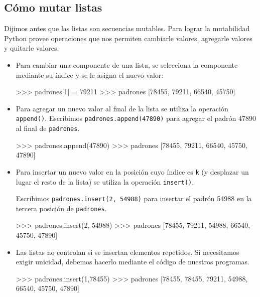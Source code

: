 \subsection{Cómo mutar listas}

Dijimos antes que las listas son secuencias mutables. Para lograr la
mutabilidad Python provee operaciones que nos permiten cambiarle valores,
agregarle valores y quitarle valores.

\begin{itemize}

\item Para cambiar una componente de una lista, se selecciona la componente
mediante su índice y se le asigna el nuevo valor:

\begin{codigo-python-sn}
>>> padrones[1] = 79211
>>> padrones
[78455, 79211, 66540, 45750]
\end{codigo-python-sn}

\item Para agregar un nuevo valor al final de la lista se utiliza la
operación \lstinline+append()+.  Escribimos \lstinline+padrones.append(47890)+ para
agregar el padrón 47890 al final de \lstinline+padrones+.

\begin{codigo-python-sn}
>>> padrones.append(47890)
>>> padrones
[78455, 79211, 66540, 45750, 47890]
\end{codigo-python-sn}

\item Para insertar un nuevo valor en la posición cuyo índice es
\lstinline+k+ (y desplazar un lugar el resto de la lista) se utiliza la
operación \lstinline+insert()+.

Escribimos \lstinline+padrones.insert(2, 54988)+ para insertar el padrón 54988 en
la tercera posición de \lstinline+padrones+.

\begin{codigo-python-sn}
>>> padrones.insert(2, 54988)
>>> padrones
[78455, 79211, 54988, 66540, 45750, 47890]
\end{codigo-python-sn}

\item Las listas no controlan si se insertan elementos repetidos. Si necesitamos
exigir unicidad, debemos hacerlo mediante el código de nuestros programas.
\begin{codigo-python-sn}
>>> padrones.insert(1,78455)
>>> padrones
[78455, 78455, 79211, 54988, 66540, 45750, 47890]
\end{codigo-python-sn}


\end{itemize}
